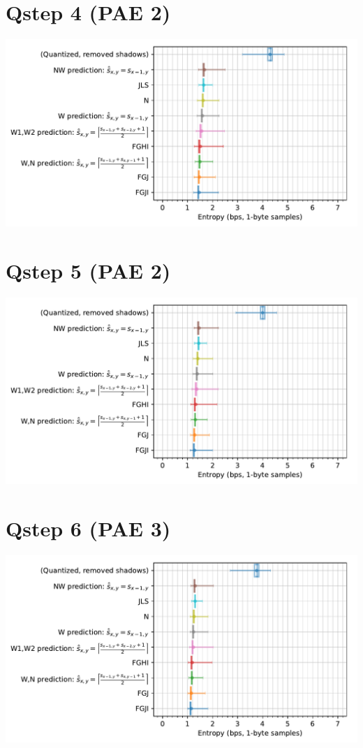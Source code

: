 \documentclass{class/technicalReportUAB}
\begin{document}
\section{Qstep 4 (PAE 2)}
\includegraphics[width=\linewidth]{./plots_q4/ScalarNumericAnalyzer-entropy_1B_bps-boxplot-groupby__version_name.pdf}

\section{Qstep 5 (PAE 2)}
\includegraphics[width=\linewidth]{./plots_q5/ScalarNumericAnalyzer-entropy_1B_bps-boxplot-groupby__version_name.pdf}

\section{Qstep 6 (PAE 3)}
\includegraphics[width=\linewidth]{./plots_q6/ScalarNumericAnalyzer-entropy_1B_bps-boxplot-groupby__version_name.pdf}
\end{document}
